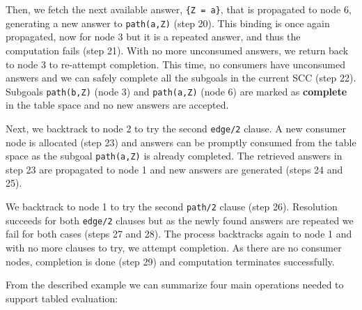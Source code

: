 Then, we fetch the next available answer, \texttt{\{Z~=~a\}}, that is propagated
to node 6, generating a new answer to \texttt{path(a,Z)} (step 20). This binding
is once again propagated, now for node 3 but it is a repeated answer, and thus
the computation fails (step 21). With no more unconsumed answers, we
return back to node 3 to re-attempt completion. This time, no consumers have
unconsumed answers and we can safely complete all the subgoals in the current SCC
(step 22). Subgoals \texttt{path(b,Z)} (node 3) and \texttt{path(a,Z)} (node 6)
are marked as \textbf{complete} in the table space and no new answers are accepted.

Next, we backtrack to node 2 to try the second \texttt{edge/2} clause. A new consumer node is allocated (step 23) and answers can be
promptly consumed from the table space as the subgoal \texttt{path(a,Z)} is already completed.
The retrieved answers in step 23 are propagated to node 1 and new answers are generated (steps 24 and 25).

We backtrack to node 1 to try the second \texttt{path/2} clause (step 26). Resolution succeeds for both
\texttt{edge/2} clauses but as the newly found answers
are repeated we fail for both cases (steps 27 and 28). The process backtracks again to node 1 and with no more clauses to try,
we attempt completion. As there are no consumer nodes, completion is done (step 29) and computation terminates successfully.

From the described example we can summarize four main operations needed to support tabled evaluation:

